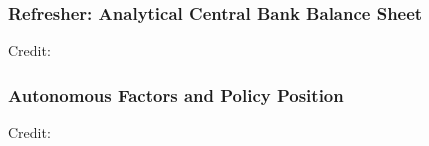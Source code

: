 \documentclass{beamer}
\begin{document}
\begin{frame}
  \frametitle{Refresher: Analytical Central Bank Balance Sheet}
  \hspace*{15pt}\hbox{\scriptsize Credit:}
\end{frame}


\begin{frame}
  \frametitle{Autonomous Factors and Policy Position}
  \hspace*{15pt}\hbox{\scriptsize Credit:}
\end{frame}
\end{document}
